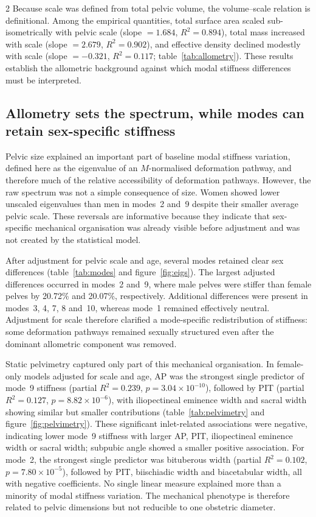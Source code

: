 \documentclass[openacc]{rsproca_new}
\begin{document}
\begin{multicols}{2}
Because scale was defined from total pelvic volume, the volume--scale relation is definitional. Among the empirical quantities, total surface area scaled sub-isometrically with pelvic scale (slope $=1.684$, $R^2=0.894$), total mass increased with scale (slope $=2.679$, $R^2=0.902$), and effective density declined modestly with scale (slope $=-0.321$, $R^2=0.117$; table~\ref{tab:allometry}). These results establish the allometric background against which modal stiffness differences must be interpreted.

\subsection{Allometry sets the spectrum, while modes can retain sex-specific stiffness}

Pelvic size explained an important part of baseline modal stiffness variation, defined here as the eigenvalue of an $M$-normalised deformation pathway, and therefore much of the relative accessibility of deformation pathways. However, the raw spectrum was not a simple consequence of size. Women showed lower unscaled eigenvalues than men in modes~2 and~9 despite their smaller average pelvic scale. These reversals are informative because they indicate that sex-specific mechanical organisation was already visible before adjustment and was not created by the statistical model.

After adjustment for pelvic scale and age, several modes retained clear sex differences (table~\ref{tab:modes} and figure~\ref{fig:eigs}). The largest adjusted differences occurred in modes~2 and~9, where male pelves were stiffer than female pelves by 20.72\% and 20.07\%, respectively. Additional differences were present in modes~3, 4, 7, 8 and~10, whereas mode~1 remained effectively neutral. Adjustment for scale therefore clarified a mode-specific redistribution of stiffness: some deformation pathways remained sexually structured even after the dominant allometric component was removed.

Static pelvimetry captured only part of this mechanical organisation. In female-only models adjusted for scale and age, AP was the strongest single predictor of mode~9 stiffness (partial $R^2=0.239$, $p=3.04 \times 10^{-10}$), followed by PIT (partial $R^2=0.127$, $p=8.82 \times 10^{-6}$), with iliopectineal eminence width and sacral width showing similar but smaller contributions (table~\ref{tab:pelvimetry} and figure~\ref{fig:pelvimetry}). These significant inlet-related associations were negative, indicating lower mode~9 stiffness with larger AP, PIT, iliopectineal eminence width or sacral width; subpubic angle showed a smaller positive association. For mode~2, the strongest single predictor was bituberous width (partial $R^2=0.102$, $p=7.80 \times 10^{-5}$), followed by PIT, biischiadic width and biacetabular width, all with negative coefficients. No single linear measure explained more than a minority of modal stiffness variation. The mechanical phenotype is therefore related to pelvic dimensions but not reducible to one obstetric diameter.


\end{multicols}
\end{document}
